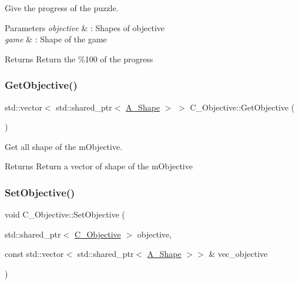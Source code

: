 Give the progress of the puzzle. 


\begin{DoxyParams}{Parameters}
{\em objective} & \+: Shapes of objective \\
\hline
{\em game} & \+: Shape of the game \\
\hline
\end{DoxyParams}
\begin{DoxyReturn}{Returns}
Return the \%100 of the progress 
\end{DoxyReturn}
\mbox{\label{classC__Objective_aa8e3dea19bd4578246b183d2bad2d475}} 
\subsubsection{\texorpdfstring{Get\+Objective()}{GetObjective()}}
{\footnotesize\ttfamily std\+::vector$<$ std\+::shared\+\_\+ptr$<$ \hyperlink{classA__Shape}{A\+\_\+\+Shape} $>$ $>$ C\+\_\+\+Objective\+::\+Get\+Objective (\begin{DoxyParamCaption}{ }\end{DoxyParamCaption})}



Get all shape of the m\+Objective. 

\begin{DoxyReturn}{Returns}
Return a vector of shape of the m\+Objective 
\end{DoxyReturn}
\mbox{\label{classC__Objective_a931d916840c73104815dbf529f9c866c}} 
\subsubsection{\texorpdfstring{Set\+Objective()}{SetObjective()}}
{\footnotesize\ttfamily void C\+\_\+\+Objective\+::\+Set\+Objective (\begin{DoxyParamCaption}\item[{std\+::shared\+\_\+ptr$<$ \hyperlink{classC__Objective}{C\+\_\+\+Objective} $>$}]{objective,  }\item[{const std\+::vector$<$ std\+::shared\+\_\+ptr$<$ \hyperlink{classA__Shape}{A\+\_\+\+Shape} $>$$>$ \&}]{vec\+\_\+objective }\end{DoxyParamCaption})\hspace{0.3cm}{\ttfamily [static]}}



